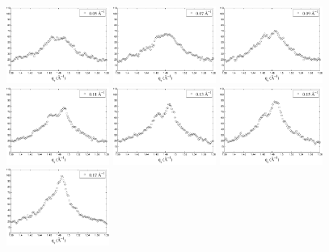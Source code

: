 \begin{figure}[htbp]
  \centering
  \includegraphics[width=0.3\textwidth]{figures/ripple/qrplot0}
  \includegraphics[width=0.3\textwidth]{figures/ripple/qrplot1}
  \includegraphics[width=0.3\textwidth]{figures/ripple/qrplot2}
  \includegraphics[width=0.3\textwidth]{figures/ripple/qrplot3}
  \includegraphics[width=0.3\textwidth]{figures/ripple/qrplot4}
  \includegraphics[width=0.3\textwidth]{figures/ripple/qrplot5}
  \includegraphics[width=0.3\textwidth]{figures/ripple/qrplot6}

\end{figure}
